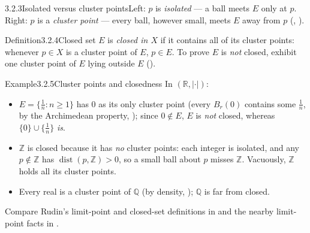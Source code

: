 \documentclass[main.tex]{subfiles}
\begin{document}
\begin{Fig}{3.2.3}{Isolated versus cluster points}{Left: $p$ is \emph{isolated} --- a ball meets $E$ only at $p$. Right: $p$ is a \emph{cluster point} --- every ball, however small, meets $E$ away from $p$ (, ).}
\end{Fig}

\begin{Obj}{Definition}{3.2.4}{Closed set}
$E$ is \emph{closed in $X$} if it contains all of its cluster points: whenever $p\in X$ is a cluster
point of $E$, $p\in E$. To prove $E$ is \emph{not} closed, exhibit one cluster point of $E$ lying
outside $E$ ().
\end{Obj}

\begin{ObjL}{Example}{3.2.5}{Cluster points and closedness}
In $(\mathbb R,|\cdot|)$:
\begin{itemize}
  \item $E=\{\tfrac1n:n\ge1\}$ has $0$ as its only cluster point
    (every $B_r(0)$ contains some $\tfrac1n$, by the Archimedean property, ); since
    $0\notin E$, $E$ is \emph{not} closed, whereas $\{0\}\cup\{\tfrac1n\}$ \emph{is}.
  \item $\mathbb Z$ is closed because it has \emph{no} cluster points: each integer is isolated, and
    any $p\notin\mathbb Z$ has $\operatorname{dist}(p,\mathbb Z)>0$, so a small ball about $p$ misses
    $\mathbb Z$. Vacuously, $\mathbb Z$ holds all its cluster points.
  \item Every real is a cluster point of $\mathbb Q$ (by density, ); $\mathbb Q$ is far
    from closed.
\end{itemize}
Compare Rudin's limit-point and closed-set definitions in  and the nearby limit-point
facts in .
\end{ObjL}
\end{document}
